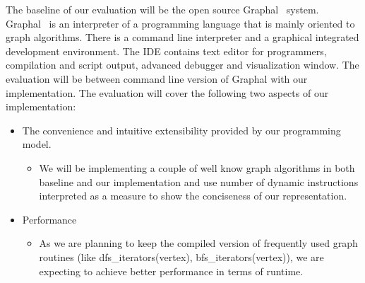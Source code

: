 The baseline of our evaluation will be the open source Graphal~\cite{Graphal} 
system.  Graphal~\cite{Graphal} is an interpreter of a programming language that 
is mainly oriented to graph algorithms. There is a command line interpreter and 
a graphical integrated development environment. The IDE contains text editor for 
programmers, compilation and script output, advanced debugger and visualization 
window. The evaluation will be between command line version of Graphal with our
implementation.
  The evaluation will
  cover the following two aspects of our implementation:
  \begin{itemize}
    \item The convenience and intuitive extensibility provided by our 
    programming model.
    \begin{itemize}
      \item We will be implementing a couple of well know graph algorithms in 
      both baseline and our implementation
        and use number of dynamic instructions interpreted as a measure to show 
        the conciseness of our
        representation.
    \end{itemize}
    \item Performance
    \begin{itemize}
      \item As we are planning to keep the compiled version of frequently used 
      graph routines (like dfs\_iterators(vertex), bfs\_iterators(vertex)), we 
      are expecting to achieve better performance in terms of runtime.  
      \end{itemize}
  \end{itemize}

